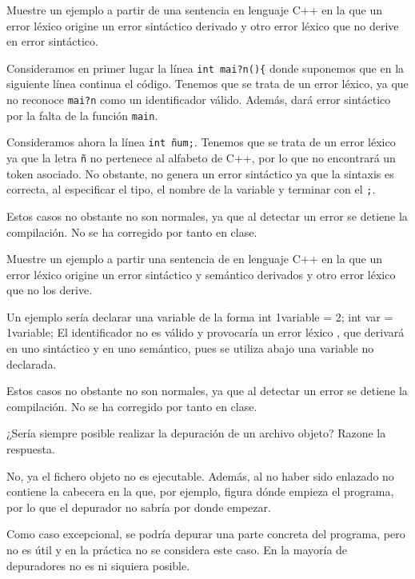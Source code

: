 \begin{ejercicio}\label{ej:3.Ejercicio7}
    Muestre un ejemplo a partir de una sentencia en lenguaje C++ en la que un error léxico origine un error sintáctico derivado y otro error léxico que no derive en error sintáctico.

    Consideramos en primer lugar la línea \verb|int mai?n(){| donde suponemos que en la siguiente línea continua el código. Tenemos que se trata de un error léxico, ya que no reconoce \verb|mai?n| como un identificador válido. Además, dará error sintáctico por la falta de la función \verb|main|.

    Consideramos ahora la línea \verb|int ñum;|. Tenemos que se trata de un error léxico ya que la letra \verb|ñ| no pertenece al alfabeto de C++, por lo que no encontrará un token asociado. No obstante, no genera un error sintáctico ya que la sintaxis es correcta, al especificar el tipo, el nombre de la variable y terminar con el \verb|;|.

    \begin{observacion}
        Estos casos no obstante no son normales, ya que al detectar un error se detiene la compilación. No se ha corregido por tanto en clase.
    \end{observacion}
\end{ejercicio}

\begin{ejercicio}\label{ej:3.Ejercicio8}
    Muestre un ejemplo a partir una sentencia de en lenguaje C++ en la que un error léxico origine un error sintáctico y semántico derivados y otro error léxico que no los derive.

    Un ejemplo sería declarar una variable de la forma int 1variable = 2; int var = 1variable; 
    El identificador no es válido y provocaría un error léxico , que derivará en uno sintáctico y en uno semántico, pues se utiliza abajo una variable no declarada. 

    \begin{observacion}
        Estos casos no obstante no son normales, ya que al detectar un error se detiene la compilación. No se ha corregido por tanto en clase.
    \end{observacion}
    
\end{ejercicio}


\begin{ejercicio}\label{ej:3.Ejercicio9}
    ¿Sería siempre posible realizar la depuración de un archivo objeto? Razone la respuesta.

    No, ya el fichero objeto no es ejecutable. Además, al no haber sido enlazado no contiene la cabecera en la que, por ejemplo, figura dónde empieza el programa, por lo que el depurador no sabría por donde empezar.

    Como caso excepcional, se podría depurar una parte concreta del programa, pero no es útil y en la práctica no se considera este caso. En la mayoría de depuradores no es ni siquiera posible.
\end{ejercicio}

